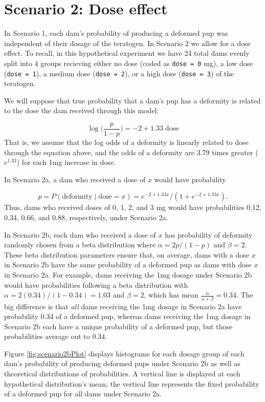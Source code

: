 \documentclass[
]{krantz}
\begin{document}
\hypertarget{scenario-2-dose-effect}{%
\section{Scenario 2: Dose effect}\label{scenario-2-dose-effect}}

In Scenario 1, each dam's probability of producing a deformed pup was independent of their dosage of the teratogen. In Scenario 2 we allow for a dose effect. To recall, in this hypothetical experiment we have 24 total dams evenly split into 4 groups recieving either no dose (coded as \texttt{dose\ =\ 0} mg), a low dose (\texttt{dose\ =\ 1}), a medium dose (\texttt{dose\ =\ 2}), or a high dose (\texttt{dose\ =\ 3}) of the teratogen.

We will suppose that true probability that a dam's pup has a deformity is related to the dose the dam received through this model:

\[ \log \bigg(\frac{p}{1-p} \bigg) = -2 + 1.33\; \textrm{dose} \]
That is, we assume that the log odds of a deformity is linearly related to dose through the equation above, and the odds of a deformity are 3.79 times greater (\(e^{1.33}\)) for each 1mg increase in dose.

In Scenario 2a, a dam who received a dose of \(x\) would have probability

\[p = P(\textrm{deformity}\mid \textrm{dose} = x) = e^{-2+1.33x}/(1+e^{-2+1.33x}). \]
Thus, dams who received doses of 0, 1, 2, and 3 mg would have probabilities 0.12, 0.34, 0.66, and 0.88, respectively, under Scenario 2a.

In Scenario 2b, each dam who received a dose of \(x\) has probability of deformity randomly chosen from a beta distribution where \(\alpha = 2p/(1-p)\) and \(\beta = 2\). These beta distribution parameters ensure that, on average, dams with a dose \(x\) in Scenario 2b have the same probability of a deformed pup as dams with dose \(x\) in Scenario 2a. For example, dams receiving the 1mg dosage under Scenario 2b would have probabilities following a beta distribution with \(\alpha = 2(0.34)/(1-0.34) = 1.03\) and \(\beta = 2\), which has mean \(\frac{\alpha}{\alpha + \beta}=0.34\). The big difference is that \emph{all} dams receiving the 1mg dosage in Scenario 2a have probability 0.34 of a deformed pup, whereas dams receiving the 1mg dosage in Scenario 2b each have a unique probability of a deformed pup, but those probabilities average out to 0.34.

Figure \ref{fig:scenario2bPlot} displays histograms for each dosage group of each dam's probability of producing deformed pups under Scenario 2b as well as theoretical distributions of probabilities. A vertical line is displayed at each hypothetical distribution's mean; the vertical line represents the fixed probability of a deformed pup for all dams under Scenario 2a.
\end{document}
